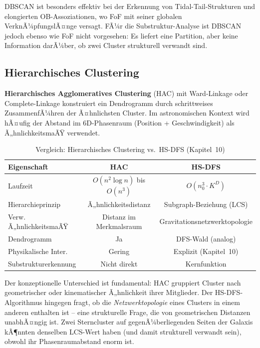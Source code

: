 ﻿\documentclass[a4paper,12pt]{report}
\theoremstyle{definition}
\begin{document}
DBSCAN ist besonders effektiv bei der Erkennung von Tidal-Tail-Strukturen und elongierten OB-Assoziationen, wo FoF mit seiner globalen VerknÃ¼pfungslÃ¤nge versagt. FÃ¼r die Substruktur-Analyse ist DBSCAN jedoch ebenso wie FoF nicht vorgesehen: Es liefert eine Partition, aber keine Information darÃ¼ber, ob zwei Cluster strukturell verwandt sind.

\subsection{Hierarchisches Clustering}
\label{ssec:hierarchisch}

\textbf{Hierarchisches Agglomeratives Clustering} (HAC) mit Ward-Linkage oder Complete-Linkage konstruiert ein Dendrogramm durch schrittweises ZusammenfÃ¼hren der Ã¤hnlichsten Cluster. Im astronomischen Kontext wird hÃ¤ufig der Abstand im 6D-Phasenraum (Position + Geschwindigkeit) als Ã„hnlichkeitsmaÃŸ verwendet.

\begin{table}[H]
\centering
\caption{Vergleich: Hierarchisches Clustering vs.\ HS-DFS (Kapitel~10)}
\label{tab:hac}
\begin{tabular}{lcc}
\toprule
Eigenschaft & HAC & HS-DFS \\
\midrule
Laufzeit & $O(n^2 \log n)$ bis $O(n^3)$ & $O(n_0^3 \cdot K^D)$ \\
Hierarchieprinzip & Ã„hnlichkeitsdistanz & Subgraph-Beziehung (LCS) \\
Verw. Ã„hnlichkeitsmaÃŸ & Distanz im Merkmalsraum & Gravitationsnetzwerktopologie \\
Dendrogramm & Ja & DFS-Wald (analog) \\
Physikalische Inter. & Gering & Explizit (Kapitel~10) \\
Substrukturerkennung & Nicht direkt & Kernfunktion \\
\bottomrule
\end{tabular}
\end{table}

Der konzeptionelle Unterschied ist fundamental: HAC gruppiert Cluster nach geometrischer oder kinematischer Ã„hnlichkeit ihrer Mitglieder. Der HS-DFS-Algorithmus hingegen fragt, ob die \emph{Netzwerktopologie} eines Clusters in einem anderen enthalten ist -- eine strukturelle Frage, die von geometrischen Distanzen unabhÃ¤ngig ist. Zwei Sterncluster auf gegenÃ¼berliegenden Seiten der Galaxis kÃ¶nnten denselben LCS-Wert haben (und damit strukturell verwandt sein), obwohl ihr Phasenraumabstand enorm ist.
\end{document}

